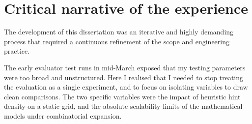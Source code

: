 %



\section{Critical narrative of the experience}\label{sec:challenges}

The development of this dissertation was an iterative and highly demanding process that required a continuous refinement of the scope and engineering practice.

The early evaluator test runs in mid-March exposed that my testing parameters were too broad and unstructured. Here I realised that I needed to stop treating the evaluation as a single experiment, and to focus on isolating variables to draw clean comparisons. The two specific variables were the impact of heuristic hint density on a static grid, and the absolute scalability limits of the mathematical models under combinatorial expansion. 

